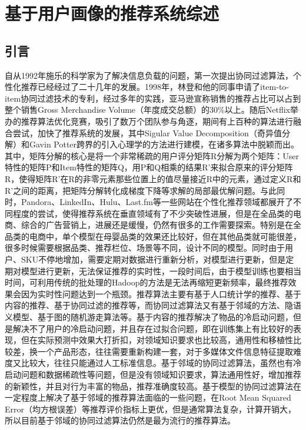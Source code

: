 \chapter{基于用户画像的推荐系统综述}
	\section{引言}
	自从1992年施乐的科学家为了解决信息负载的问题，第一次提出协同过滤算法，个性化推荐已经经过了二十几年的发展。1998年，林登和他的同事申请了item-to-item协同过滤技术的专利，经过多年的实践，亚马逊宣称销售的推荐占比可以占到整个销售Gross Merchandise Volume（年度成交总额）的30\%以上。随后Netflix举办的推荐算法优化竞赛，吸引了数万个团队参与角逐，期间有上百种的算法进行融合尝试，加快了推荐系统的发展，其中Sigular Value Decomposition（奇异值分解）和Gavin Potter跨界的引入心理学的方法进行建模，在诸多算法中脱颖而出。其中，矩阵分解的核心是将一个非常稀疏的用户评分矩阵R分解为两个矩阵：User特性的矩阵P和Item特性的矩阵Q，用P和Q相乘的结果R'来拟合原来的评分矩阵R，使得矩阵R'在R的非零元素那些位置上的值尽量接近R中的元素，通过定义R和R'之间的距离，把矩阵分解转化成梯度下降等求解的局部最优解问题。与此同时，Pandora、LinkedIn、Hulu、Last.fm等一些网站在个性化推荐领域都展开了不同程度的尝试，使得推荐系统在垂直领域有了不少突破性进展，但是在全品类的电商、综合的广告营销上，进展还是缓慢，仍然有很多的工作需要探索。特别是在全品类的电商中，单个模型在母婴品类的效果还比较好，但在其他品类就可能很差，很多时候需要根据品类、推荐栏位、场景等不同，设计不同的模型。同时由于用户、SKU不停地增加，需要定期对数据进行重新分析，对模型进行更新，但是定期对模型进行更新，无法保证推荐的实时性，一段时间后，由于模型训练也要相当时间，可利用传统的批处理的Hadoop的方法是无法再缩短更新频率，最终推荐效果会因为实时性问题达到一个瓶颈。推荐算法主要有基于人口统计学的推荐、基于内容的推荐、基于协同过滤的推荐等，而协同过滤算法又有基于邻域的方法、隐语义模型、基于图的随机游走算法等。基于内容的推荐解决了物品的冷启动问题，但是解决不了用户的冷启动问题，并且存在过拟合问题，即在训练集上有比较好的表现，但在实际预测中效果大打折扣，对领域知识要求也比较高，通用性和移植性比较差，换一个产品形态，往往需要重新构建一套，对于多媒体文件信息特征提取难度又比较大，往往只能通过人工标准信息。基于邻域的协同过滤算法，虽然也有冷启动问题和数据稀疏性等问题，但是没有领域知识要求，算法通用性好，增加推荐的新颖性，并且对行为丰富的物品，推荐准确度较高。基于模型的协同过滤算法在一定程度上解决了基于邻域的推荐算法面临的一些问题，在Root Mean Squared Error（均方根误差）等推荐评价指标上更优，但是通常算法复杂，计算开销大，所以目前基于邻域的协同过滤算法仍然是最为流行的推荐算法。

